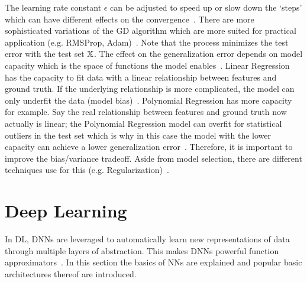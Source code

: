 The learning rate constant $\epsilon$ can be adjusted to speed up or slow down the `steps' which
can have different effects on the convergence~\citep{goodfellow_deep_2016}.
There are more sophisticated variations of the \ac{GD} algorithm which are more suited for practical
application (e.g. RMSProp, Adam)~\citep{geron_hands-machine_2017}.
Note that the process minimizes the test error with the test set $\mathbb{X}$.
The effect on the generalization error depends on model capacity which is the space of functions
the model enables~\citep{goodfellow_deep_2016}.
Linear Regression has the capacity to fit data with a linear relationship between features and
ground truth.
If the underlying relationship is more complicated, the model can only underfit the data (model
bias)~\citep{goodfellow_deep_2016}.
Polynomial Regression has more capacity for example.
Say the real relationship between features and ground truth now actually is linear;
the Polynomial Regression model can overfit for statistical outliers in the test set which is why
in this case the model with the lower capacity can achieve a lower generalization
error~\citep{geron_hands-machine_2017}.
Therefore, it is important to improve the bias/variance tradeoff.
Aside from model selection, there are different techniques use for this (e.g.
Regularization)~\citep{goodfellow_deep_2016}.

\section{Deep Learning}
In \ac{DL}, \acp{DNN} are leveraged to automatically learn new representations of data through
multiple layers of abstraction.
This makes \acp{DNN} powerful function approximators~\citep{goodfellow_deep_2016}.
In this section the basics of \acp{NN} are explained and popular basic architectures thereof are
introduced.

